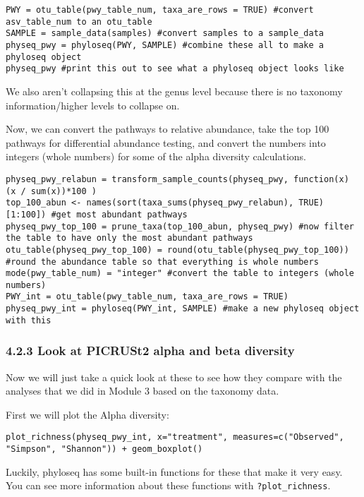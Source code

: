 \documentclass[
]{book}
\begin{document}
\begin{verbatim}
PWY = otu_table(pwy_table_num, taxa_are_rows = TRUE) #convert asv_table_num to an otu_table
SAMPLE = sample_data(samples) #convert samples to a sample_data
physeq_pwy = phyloseq(PWY, SAMPLE) #combine these all to make a phyloseq object
physeq_pwy #print this out to see what a phyloseq object looks like
\end{verbatim}

We also aren't collapsing this at the genus level because there is no taxonomy information/higher levels to collapse on.

Now, we can convert the pathways to relative abundance, take the top 100 pathways for differential abundance testing, and convert the numbers into integers (whole numbers) for some of the alpha diversity calculations.

\begin{verbatim}
physeq_pwy_relabun = transform_sample_counts(physeq_pwy, function(x) (x / sum(x))*100 )
top_100_abun <- names(sort(taxa_sums(physeq_pwy_relabun), TRUE)[1:100]) #get most abundant pathways
physeq_pwy_top_100 = prune_taxa(top_100_abun, physeq_pwy) #now filter the table to have only the most abundant pathways
otu_table(physeq_pwy_top_100) = round(otu_table(physeq_pwy_top_100)) #round the abundance table so that everything is whole numbers
mode(pwy_table_num) = "integer" #convert the table to integers (whole numbers)
PWY_int = otu_table(pwy_table_num, taxa_are_rows = TRUE)
physeq_pwy_int = phyloseq(PWY_int, SAMPLE) #make a new phyloseq object with this
\end{verbatim}

\subsubsection{4.2.3 Look at PICRUSt2 alpha and beta diversity}\label{look-at-picrust2-alpha-and-beta-diversity}

Now we will just take a quick look at these to see how they compare with the analyses that we did in Module 3 based on the taxonomy data.

First we will plot the Alpha diversity:

\begin{verbatim}
plot_richness(physeq_pwy_int, x="treatment", measures=c("Observed", "Simpson", "Shannon")) + geom_boxplot()
\end{verbatim}

Luckily, phyloseq has some built-in functions for these that make it very easy. You can see more information about these functions with \texttt{?plot\_richness}.
\end{document}
